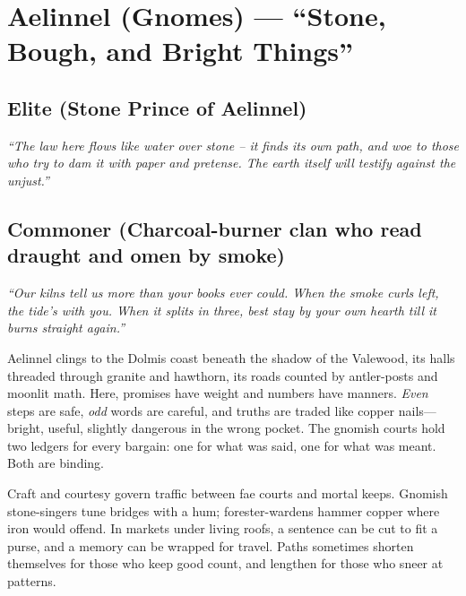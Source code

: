 \section{Aelinnel (Gnomes) --- ``Stone, Bough, and Bright Things''}
\label{chap:aelinnel}

\subsection*{Elite (Stone Prince of Aelinnel)}
\textit{``The law here flows like water over stone – it finds its own path, and woe to those who try to dam it with paper and pretense. The earth itself will testify against the unjust.''}

\subsection*{Commoner (Charcoal-burner clan who read draught and omen by smoke)}
\textit{``Our kilns tell us more than your books ever could. When the smoke curls left, the tide's with you. When it splits in three, best stay by your own hearth till it burns straight again.''}


\begin{tcolorbox}[colback=black!3,colframe=black!40!white,title={Stone, Bough, and Bright Things}]
Aelinnel clings to the Dolmis coast beneath the shadow of the Valewood, its halls threaded through granite and hawthorn, its roads counted by antler-posts and moonlit math. Here, promises have weight and numbers have manners. \emph{Even} steps are safe, \emph{odd} words are careful, and truths are traded like copper nails---bright, useful, slightly dangerous in the wrong pocket. The gnomish courts hold two ledgers for every bargain: one for what was said, one for what was meant. Both are binding.

Craft and courtesy govern traffic between fae courts and mortal keeps. Gnomish stone-singers tune bridges with a hum; forester-wardens hammer copper where iron would offend. In markets under living roofs, a sentence can be cut to fit a purse, and a memory can be wrapped for travel. Paths sometimes shorten themselves for those who keep good count, and lengthen for those who sneer at patterns.
\end{tcolorbox}


